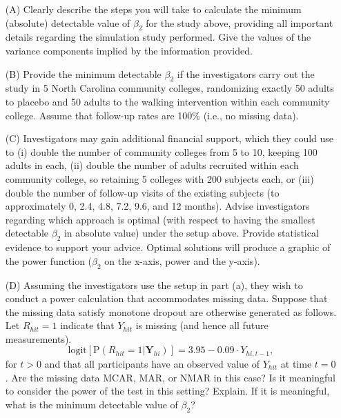 								\begin{itemize}
								\vspace{0.2cm} 
								\item[(A)] Clearly describe the steps you will take to calculate the minimum (absolute) detectable value of $\beta_2$ for the study above, providing all
								           important details regarding the simulation study performed. Give the values of the variance components implied by the information provided. 		


								\vspace{0.2cm} 
								\item[(B)] Provide the minimum detectable $\beta_2$ if the investigators carry out the study in 5 North Carolina community colleges, randomizing exactly
													 50 adults to placebo and 50 adults to the walking intervention within each community college. Assume that follow-up rates are 100\% (i.e., no missing data).


								\vspace{0.2cm} 
								\item[(C)] Investigators may gain additional financial support, which they could use to (i) double the number of community colleges from 5 to 10, keeping 100 adults in 
													 each, (ii) double the number of adults recruited within each community college, so retaining 5 colleges with 200 subjects each, or (iii) double the number of 
													 follow-up visits of the existing subjects (to approximately 0, 2.4, 4.8, 7.2, 9.6, and 12 months). Advise investigators regarding which approach is optimal 
													 (with respect to having the smallest detectable $\beta_2$ in absolute value) under the setup above. Provide statistical evidence to support your advice. Optimal
													 solutions will produce a graphic of the power function ($\beta_2$ on the x-axis, power and the y-axis).

								\vspace{0.2cm} 
								\item[(D)] Assuming the investigators use the setup in part (a), they wish to conduct a power calculation that accommodates missing data. Suppose that the missing data satisfy 
													 monotone dropout are otherwise generated as follows. Let $R_{hit}=1$ indicate that $Y_{hit}$ is missing (and hence all future measurements).
														\[
																 \text{logit}\left[\text{P}\left( R_{hit} = 1 \big|  \mathbf{Y}_{hi}\right)\right] = 3.95 - 0.09 \cdot Y_{hi,t-1},
														\]
													 for $t>0$ and that all participants have an observed value of $Y_{hit}$ at time $t=0$. Are the missing data MCAR, MAR, or NMAR in this case? Is it meaningful 
													 to consider the power of the test in this setting? Explain. If it is meaningful, what is the minimum detectable value of $\beta_2$?
													 \end{itemize}
							

